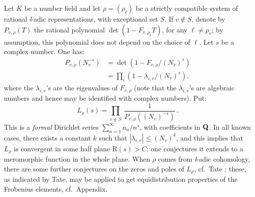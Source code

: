 Let $K$ be a number field and let $\rho = (\rho_\ell)$ be a strictly
compatible system of rational \textit{l}-adic representations, with
exceptional set $S$.  If $v \notin S$, denote by $P_{v,\rho}(T)$ the
rational polynomial $\det(1 - F_{v,\rho_\ell}T)$, for any
$\ell \neq p_v$; by assumption, this polynomial does not depend on the
choice of $\ell$.  Let $s$ be a complex number.  One has:
\begin{align*}
P_{v,\rho}(N_v^{-s}) &= \det(1 - F_{v,\rho}/(N_v)^s) \\
&= \prod_i (1 - \lambda_{i,v}/(N_v)^s),
\end{align*}
where the $\lambda_{i,v}$'s are the eigenvalues of $F_{v,\rho}$ (note
that the $\lambda_{i,v}$'s are algebraic numbers and hence may be
identified with complex numbers).  Put:
\[
L_\rho(s) = \prod_{v \notin S}\ \frac{1}{P_{v,\rho}((N_v)^{-s})}\,.
\]
This is a \emph{formal} Dirichlet series
$\sum\limits_{n=1}^{\infty} a_n/n^s$, with coefficients in $\mathbf{Q}$.  In
all known cases, there exists a constant $k$ such that
$|\lambda_{i,v}| \leq (N_v)^k$, and this implies that $L_\rho$ is
convergent in some half plane $\mathrm{R}(s) > C$; one conjectures it
extends to a meromorphic function in the whole plane.  When $\rho$
comes from \textit{l}-adic cohomology, there are some further
conjectures on the zeros and poles of $L_\rho$, cf.~Tate
\cite{tate-cycles}; these, as indicated by Tate, may be applied to get
equidistribution properties of the Frobenius elements, cf.~Appendix.

